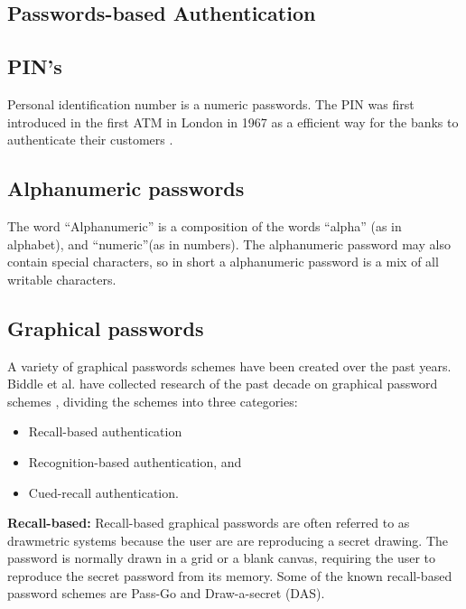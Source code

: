     \subsection{Passwords-based Authentication}

      \subsection*{PIN's}
        Personal identification number is a numeric passwords. The PIN was first introduced in the first ATM in London in 1967 as a efficient way for the banks to authenticate their customers \cite{Bonneau1}.      

      \subsection*{Alphanumeric passwords}

        The word ``Alphanumeric'' is a composition of the words ``alpha'' (as in alphabet), and ``numeric''(as in numbers). The alphanumeric password may also contain special characters, so in short a alphanumeric password is a mix of all writable characters.

      \subsection*{Graphical passwords}

      A variety of graphical passwords schemes have been created over the past years. Biddle et al. have collected research of the past decade on graphical password schemes \cite{Biddle}, dividing the schemes into three categories: 

      \begin{itemize}
        \item Recall-based authentication
        \item Recognition-based authentication, and 
        \item Cued-recall authentication.
      \end{itemize}

      {\bf Recall-based:} Recall-based graphical passwords are often referred to as drawmetric systems \cite{DeAngeli} because the user are are reproducing a secret drawing. The password is normally drawn in a grid or a blank canvas, requiring the user to reproduce the secret password from its memory. Some of the known recall-based password schemes are Pass-Go and Draw-a-secret (DAS).

